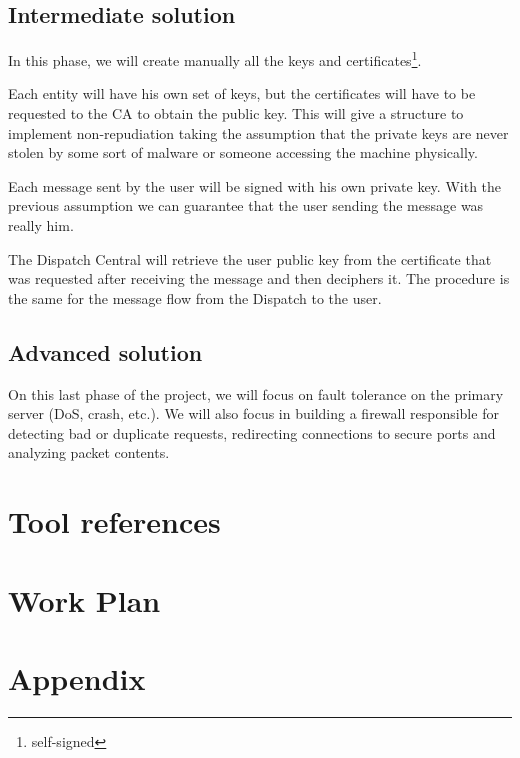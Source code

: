 \documentclass[a4paper,titlepage,11pt]{article}
\begin{document}
\subsection{Intermediate solution}
In this phase, we will create manually all the keys and certificates\footnote{self-signed}.

Each entity will have his own set of keys, but the certificates will have to be requested to the CA to obtain the public key.
This will give a structure to implement non-repudiation taking the assumption that the private keys are never stolen
by some sort of malware or someone accessing the machine physically.

Each message sent by the user will be signed with his own private key.
With the previous assumption we can guarantee that the user sending the message was really him.

The Dispatch Central will retrieve the user public key from the certificate that was requested after receiving the message and then deciphers it.
The procedure is the same for the message flow from the Dispatch to the user.

\subsection{Advanced solution}
On this last phase of the project, we will focus on fault tolerance on the primary server (DoS, crash, etc.).
We will also focus in building a firewall responsible for detecting bad or duplicate requests,
redirecting connections to secure ports and analyzing packet contents.

\section{Tool references}

\section{Work Plan}

\newpage

\section{Appendix}
\end{document}
